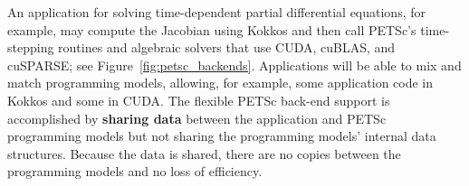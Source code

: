 \documentclass[5p,times]{elsarticle}
\begin{document}
An application for solving time-dependent partial differential
equations, for example, may compute the Jacobian using Kokkos 
and then call PETSc's time-stepping
routines and algebraic solvers that use CUDA, cuBLAS,
and cuSPARSE; see Figure~\ref{fig:petsc_backends}.
Applications will be able to mix and match programming models,
allowing, for example, some application code in Kokkos and some in CUDA. The
flexible PETSc back-end support is accomplished by {\bf sharing data} between the application and PETSc programming models but not
sharing the programming models' internal data structures.
Because the data is shared, there are no copies between the programming models and no loss of efficiency.

\end{document}
